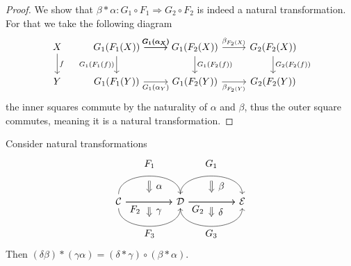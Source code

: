 \begin{proof}
    We show that $ \beta * \alpha \colon G_1 \circ F_1 \Rightarrow G_2 \circ F_2 $ is indeed a natural transformation. 
    For that we take the following diagram 
     \[
     \begin{tikzcd}
         X
         \ar[d, "f"]
         &
         G_1 ( F_1 ( X ) ) 
         \ar[r , " G_1 ( \alpha_X ) "]
         \ar[r, " G_1 ( \alpha_X ) "]
         \ar[d, " G_1 ( F_1 ( f ) ) "']
         &
         G_1 ( F_2 ( X ) ) 
         \ar[ r, " \beta_{ F_2 ( X ) } "]
         \ar[d, " G_1 ( F_2 ( f ) ) "]
         & 
         G_2 ( F_2 ( X ) )
         \ar[d, " G_2 ( F_2 ( f ) ) "]
         \\
         Y
         &
         G_1 ( F_1 ( Y ) )
         \ar[ r , " G_1 ( \alpha_Y ) "']
         &
         G_1 ( F_2 ( Y ) ) 
         \ar[ r, " {\beta_{ F_2 ( Y ) }}"']
         & 
         G_2 ( F_2 ( Y ) ) 
     \end{tikzcd}
     \]
     the inner squares commute by the naturality of $ \alpha $ and $ \beta $, thus the outer square commutes, meaning it is a natural transformation.
\end{proof}

\begin{prop}
    Consider natural transformations 
    \[
    \begin{tikzcd}[column sep=huge]	
    	\mathcal{C}
    	\arrow[bend left=90]{r}[name=U,label=above:$F_1$]{}
    	\arrow[bend right=90]{r}[name=D,label=below:$F_3$]{}
    	\arrow{r}[name=M]{}
    	\arrow{r}[label=below:$F_2$, pos=0.2]{}
    	&
    	\mathcal{D}
    	\arrow[shorten <=5pt,shorten >=5pt,Rightarrow,to path={(U) -- node[label=right:$\alpha$] {} (M)}]{}
    	\arrow[shorten <=5pt,shorten >=5pt,Rightarrow,to path={(M) -- node[label=right:$\gamma$] {} (D)}]{}
    	\arrow[bend left=90]{r}[name=U',label=above:$G_1$]{}
    	\arrow[bend right=90]{r}[name=D',label=below:$G_3$]{}
    	\arrow{r}[name=M']{}
    	\arrow{r}[label=below:$G_2$, pos=0.2]{}
    	&
    	\mathcal{E} 
    	\arrow[shorten <=5pt,shorten >=5pt,Rightarrow,to path={(U') -- node[label=right:$\beta$] {} (M')}]{}
    	\arrow[shorten <=5pt,shorten >=5pt,Rightarrow,to path={(M') -- node[label=right:$\delta$] {} (D')}]{}    	
    \end{tikzcd}	
	\]
    Then $ ( \delta \beta ) * ( \gamma \alpha ) = ( \delta * \gamma ) \circ ( \beta * \alpha ) $.
\end{prop}

